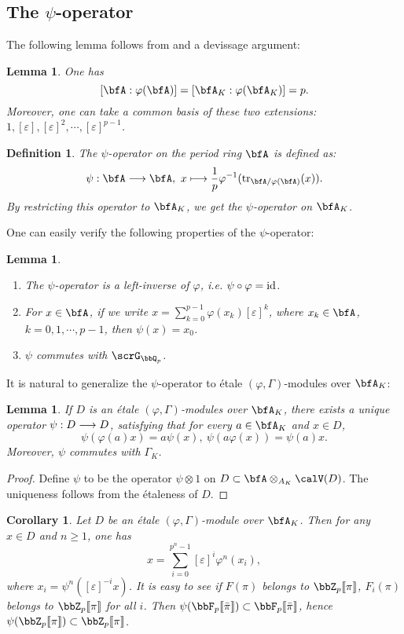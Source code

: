 \documentclass[a4paper,oneside]{amsart}
\newtheorem{lemma}[theorem]{Lemma}
\newtheorem{definition}[theorem]{Definition}
\newtheorem{corollary}[theorem]{Corollary}
\numberwithin{equation}{section}
\numberwithin{figure}{section}
\begin{document}
\subsection{The $\psi$-operator}
The following lemma follows from \cite[Theorem 29.2]{matsumura_commutative_1987} and a devissage argument:
\begin{lemma}
    One has
    $$[\bfA:\varphi(\bfA)]=[\bfA_K:\varphi(\bfA_K)]=p.$$
    Moreover, one can take a common basis of these two extensions:
    $1,[\varepsilon],[\varepsilon]^2,\cdots,[\varepsilon]^{p-1}$.
\end{lemma}
\begin{definition}
    The $\psi$-operator on the period ring $\bfA$ is defined as:
    $$\psi:\bfA\lto\bfA,\ x\longmapsto \frac{1}{p}\varphi^{-1}(\opn{tr}_{\bfA/\varphi(\bfA)}(x)).$$
    By restricting this operator to $\bfA_K$, we get the $\psi$-operator on $\bfA_K$.
\end{definition}
One can easily verify the following properties of the $\psi$-operator:
\begin{lemma}\leavevmode
    \begin{enumerate}
        \item The $\psi$-operator is a left-inverse of $\varphi$, i.e. $\psi\circ\varphi=\operatorname{id}$.
        \item For $x\in\bfA$, if we write $x=\sum_{k=0}^{p-1}\varphi(x_k)[\varepsilon]^k$, where $x_k\in\bfA$, $k=0,1,\cdots,p-1$, then $\psi(x)=x_0$.
        \item $\psi$ commutes with $\scrG_{\bbQ_p}$.
    \end{enumerate}
\end{lemma}

It is natural to generalize the $\psi$-operator to \'etale $(\varphi,\Gamma)$-modules over $\bfA_K$:
\begin{lemma}
    If $D$ is an \'etale $(\varphi,\Gamma)$-modules over $\bfA_K$, there exists a unique operator $\psi:D\longrightarrow D$, satisfying that for every $a\in\bfA_K$ and $x\in D$,
    $$\psi(\varphi(a)x)=a\psi(x),\ \psi(a\varphi(x))=\psi(a)x.$$ Moreover, $\psi$ commutes with $\Gamma_K$.
\end{lemma}
\begin{proof}
    Define $\psi$ to be the operator $\psi\otimes 1$ on $D\subset\bfA\otimes_{A_K}\calV(D)$.  The uniqueness follows from the \'etaleness of $D$.
\end{proof}

\begin{corollary}
    Let $D$ be an \'etale $(\varphi,\Gamma)$-module over $\bfA_K$. Then for any $x\in D$ and $n\geq 1$, one has
    $$x=\sum_{i=0}^{p^n-1}[\varepsilon]^i\varphi^n(x_i),$$
    where $x_i=\psi^n([\varepsilon]^{-i}x)$. It is easy to see if $F(\pi)$ belongs to $\bbZ_p\llbracket\pi\rrbracket$, $F_i(\pi)$ belongs to $\bbZ_p\llbracket\pi\rrbracket$ for all $i$. Then $\psi(\bbF_p\llbracket\bar{\pi}\rrbracket)\subset\bbF_p\llbracket\bar{\pi}\rrbracket$, hence $\psi(\bbZ_p\llbracket\pi\rrbracket)\subset\bbZ_p\llbracket\pi\rrbracket$.
\end{corollary}
\end{document}

